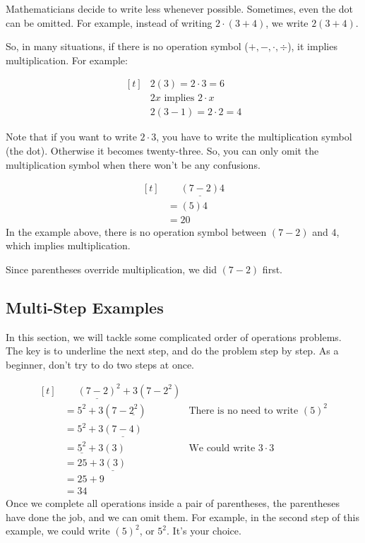 Mathematicians decide to write less whenever possible. Sometimes, even the dot can be omitted. For example, instead of writing $2\cdot(3+4)$, we write $2(3+4)$.

So, in many situations, if there is no operation symbol ($+,-,\cdot,\div$), it implies multiplication. For example:

\[
\begin{aligned}[t]
   & 2(3)=2\cdot3=6 \\
   & 2x \text{ implies } 2\cdot x \\
   & 2(3-1)=2\cdot2=4
\end{aligned}
\]

Note that if you want to write $2\cdot3$, you have to write the multiplication symbol (the dot). Otherwise it becomes twenty-three. So, you can only omit the multiplication symbol when there won't be any confusions.

\begin{myexample}
\[
\begin{aligned}[t]
   &\phantom{{}=} \underline{(7-2)}4 \\
   &= (5)4 \\
   &= 20
\end{aligned}
\]
In the example above, there is no operation symbol between $(7-2)$ and $4$, which implies multiplication.

Since parentheses override multiplication, we did $(7-2)$ first.
\end{myexample}


\subsection{Multi-Step Examples}

In this section, we will tackle some complicated order of operations problems. The key is to underline the next step, and do the problem step by step. As a beginner, don't try to do two steps at once.

\begin{myexample}
\[
\begin{aligned}[t]
   &\phantom{{}=} \underline{(7-2)}^{2}+3(7-2^{2}) \\
   &= 5^{2}+3(7-\underline{2^{2}}) &\text{There is no need to write }(5)^{2}\\
   &= 5^{2}+3\underline{(7-4)} \\
   &= \underline{5^{2}}+3(3) &\text{We could write }3\cdot3\\
   &= 25+\underline{3(3)} \\
   &= 25+9 \\
   &= 34
\end{aligned}
\]
Once we complete all operations inside a pair of parentheses, the parentheses have done the job, and we can omit them. For example, in the second step of this example, we could write $(5)^{2}$, or $5^{2}$. It's your choice.
\end{myexample}

